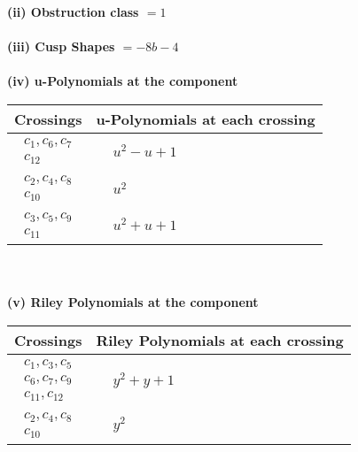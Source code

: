 \documentclass[1p]{elsarticle_modified}
\theoremstyle{definition}
\begin{document}
\flushleft \textbf{(ii) Obstruction class $= 1$}\\~\\
\flushleft \textbf{(iii) Cusp Shapes $= -8 b-4$}\\~\\
\newpage\renewcommand{\arraystretch}{1}
\flushleft \textbf{(iv) u-Polynomials at the component}\newline \\
\begin{tabular}{m{50pt}|m{274pt}}
Crossings & \hspace{64pt}u-Polynomials at each crossing \\
\hline $$\begin{aligned}c_{1},c_{6},c_{7}\\c_{12}\end{aligned}$$&$\begin{aligned}
&u^2- u+1
\end{aligned}$\\
\hline $$\begin{aligned}c_{2},c_{4},c_{8}\\c_{10}\end{aligned}$$&$\begin{aligned}
&u^2
\end{aligned}$\\
\hline $$\begin{aligned}c_{3},c_{5},c_{9}\\c_{11}\end{aligned}$$&$\begin{aligned}
&u^2+u+1
\end{aligned}$\\
\hline
\end{tabular}\\~\\
\newpage\renewcommand{\arraystretch}{1}
\flushleft \textbf{(v) Riley Polynomials at the component}\newline \\
\begin{tabular}{m{50pt}|m{274pt}}
Crossings & \hspace{64pt}Riley Polynomials at each crossing \\
\hline $$\begin{aligned}c_{1},c_{3},c_{5}\\c_{6},c_{7},c_{9}\\c_{11},c_{12}\end{aligned}$$&$\begin{aligned}
&y^2+y+1
\end{aligned}$\\
\hline $$\begin{aligned}c_{2},c_{4},c_{8}\\c_{10}\end{aligned}$$&$\begin{aligned}
&y^2
\end{aligned}$\\
\hline
\end{tabular}\\~\\
\end{document}
